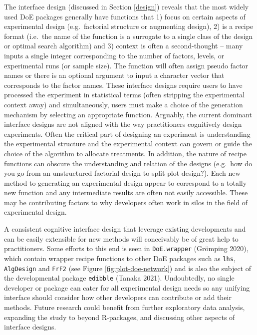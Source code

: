 \documentclass{article}
\begin{document}
The interface design (discussed in Section \ref{design}) reveals that
the most widely used DoE packages generally have functions that 1) focus
on certain aspects of experimental design (e.g.~factorial structure or
augmenting design), 2) is a recipe format (i.e.~the name of the function
is a surrogate to a single class of the design or optimal search
algorithm) and 3) context is often a second-thought -- many inputs a
single integer corresponding to the number of factors, levels, or
experimental runs (or sample size). The function will often assign
pseudo factor names or there is an optional argument to input a
character vector that corresponds to the factor names. These interface
designs require users to have processed the experiment in statistical
terms (often stripping the experimental context away) and
simultaneously, users must make a choice of the generation mechanism by
selecting an appropriate function. Arguably, the current dominant
interface designs are not aligned with the way practitioners cognitively
design experiments. Often the critical part of designing an experiment
is understanding the experimental structure and the experimental context
can govern or guide the choice of the algorithm to allocate treatments.
In addition, the nature of recipe functions can obscure the
understanding and relation of the designs (e.g.~how do you go from an
unstructured factorial design to split plot design?). Each new method to
generating an experimental design appear to correspond to a totally new
function and any intermediate results are often not easily accessible.
These may be contributing factors to why developers often work in silos
in the field of experimental design.

A consistent cognitive interface design that leverage existing
developments and can be easily extensible for new methods will
conceivably be of great help to practitioners. Some efforts to this end
is seen in \texttt{DoE.wrapper} (Grömping 2020), which contain wrapper
recipe functions to other DoE packages such as \texttt{lhs},
\texttt{AlgDesign} and \texttt{FrF2} (see Figure
\ref{fig:plot-doe-network}) and is also the subject of the developmental
package \texttt{edibble} (Tanaka 2021). Undoubtedly, no single developer
or package can cater for all experimental design needs so any unifying
interface should consider how other developers can contribute or add
their methods. Future research could benefit from further exploratory
data analysis, expanding the study to beyond R-packages, and discussing
other aspects of interface designs.
\end{document}
